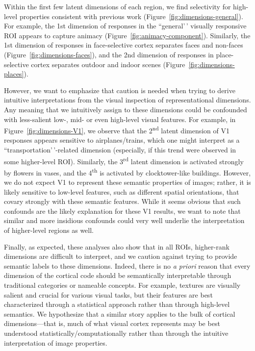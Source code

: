 \documentclass[10pt]{article}
\begin{document}
Within the first few latent dimensions of each region, we find selectivity for high-level properties consistent with previous work (Figure~\ref{fig:dimensions-general}). For example, the 1st dimension of responses in the ``general'\,' visually responsive ROI appears to capture animacy (Figure~\ref{fig:animacy-component}). Similarly, the 1st dimension of responses in face-selective cortex separates faces and non-faces (Figure~\ref{fig:dimensions-faces}), and the 2nd dimension of responses in place-selective cortex separates outdoor and indoor scenes (Figure~\ref{fig:dimensions-places}).

However, we want to emphasize that caution is needed when trying to derive intuitive interpretations from the visual inspection of representational dimensions. Any meaning that we intuitively assign to these dimensions could be confounded with less-salient low-, mid- or even high-level visual features. For example, in Figure~\ref{fig:dimensions-V1}, we observe that the 2\textsuperscript{nd} latent dimension of V1 responses appears sensitive to airplanes/trains, which one might interpret as a ``transportation'\,'-related dimension (especially, if this trend were observed in some higher-level ROI). Similarly, the 3\textsuperscript{rd} latent dimension is activated strongly by flowers in vases, and the 4\textsuperscript{th} is activated by clocktower-like buildings. However, we do not expect V1 to represent these semantic properties of images; rather, it is likely sensitive to low-level features, such as different spatial orientations, that covary strongly with these semantic features. While it seems obvious that such confounds are the likely explanation for these V1 results, we want to note that similar and more insidious confounds could very well underlie the interpretation of higher-level regions as well.

Finally, as expected, these analyses also show that in all ROIs, higher-rank dimensions are difficult to interpret, and we caution against trying to provide semantic labels to these dimensions. Indeed, there is no \emph{a priori} reason that every dimension of the cortical code should be semantically interpretable through traditional categories or nameable concepts. For example, textures are visually salient and crucial for various visual tasks, but their features are best characterized through a statistical approach \autocite{Portilla2000} rather than through high-level semantics. We hypothesize that a similar story applies to the bulk of cortical dimensions---that is, much of what visual cortex represents may be best understood statistically/computationally rather than through the intuitive interpretation of image properties.
\end{document}
